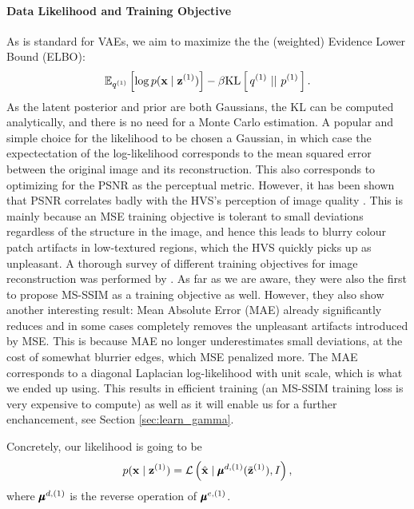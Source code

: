 \paragraph{Data Likelihood and Training Objective}
As is standard for VAEs, we aim to maximize the the (weighted) Evidence
Lower Bound (ELBO):
\begin{equation}
\label{eq:regular_vae_elbo}
\Exp{\log p(\vec{x} \mid \vec{z}^{(1)})}{q^{(1)}} - \beta\KL{q^{(1)}}{p^{(1)}}.
\end{equation}
As the latent posterior and prior are both Gaussians, the KL can be computed
analytically, and there is no need for a Monte Carlo estimation. A popular and
simple choice for the likelihood to be chosen a Gaussian, in which case the
expectectation of the log-likelihood corresponds to the mean squared error
between the original image and its reconstruction. This also corresponds to
optimizing for the PSNR as the perceptual metric. However, it has been shown
that PSNR correlates badly with the HVS's perception of image quality \cite{girod1993s}
\cite{eskicioglu1994image}. This is mainly because an MSE training objective is
tolerant to small deviations regardless of the structure in the image, and hence
this leads to blurry colour patch artifacts in low-textured regions, which the
HVS quickly picks up as unpleasant. A thorough survey of different
training objectives for image reconstruction was performed by
\cite{zhao2015loss}. As far as we are aware, they were also the first to propose
MS-SSIM as a training objective as well. However, they also show another
interesting result: Mean Absolute Error (MAE) already significantly reduces and
in some cases completely removes the unpleasant artifacts introduced by MSE.
This is because MAE no longer underestimates small deviations, at the cost of
somewhat blurrier edges, which MSE penalized more. The MAE corresponds to a
diagonal Laplacian log-likelihood with unit scale, which is what we ended up
using. This results in
efficient training (an MS-SSIM training loss is very expensive to compute) as
well as it will enable us for a further enchancement, see Section
\ref{sec:learn_gamma}.

Concretely, our likelihood is going to be
\begin{equation}
\label{eq:laplace_likelihood}
  p(\vec{x} \mid \vec{z}^{(1)}) = \Laplace{\hat{\vec{x}} \mid
  \MU^{d, (1)}(\tilde{\vec{z}}^{(1)}), I},
\end{equation}
where $\pmb{\mu}^{d, (1)}$ is the reverse operation of $\pmb{\mu}^{e, (1)}$.


